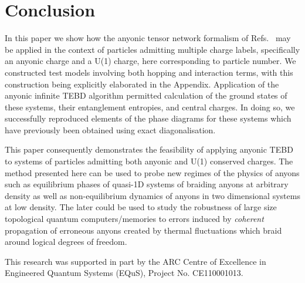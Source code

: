 \documentclass[aps,reprint,superscriptaddress,amsmath,amssymb,amsfonts,prb]{revtex4-1}
\begin{document}
\section{Conclusion}
In this paper we show how the anyonic tensor network formalism of Refs.~ may be applied in the context of particles admitting multiple charge labels, specifically an anyonic charge and a U(1) charge, here corresponding to particle number. We constructed test models involving both hopping and interaction terms, with this construction being explicitly elaborated in the Appendix. Application of the anyonic infinite TEBD algorithm\cite{Singh} permitted calculation of the ground states of these systems, their entanglement entropies, and central charges. In doing so, we successfully reproduced elements of the phase diagrams for these systems which have previously been obtained using exact diagonalisation.\cite{Feiguin2007,Trebst2008, Trebst2008a, Poilblanc2011a,Poilblanc2011}

This paper consequently demonstrates the feasibility of applying anyonic TEBD to systems of particles admitting both anyonic and U(1) conserved charges. The method presented here can be used to probe new regimes of the physics of anyons such as equilibrium phases of quasi-1D systems of braiding anyons at arbitrary density as well as non-equilibrium dynamics of anyons in two dimensional systems at low density. The later could be used to study the robustness of large size topological quantum computers/memories to errors induced by \emph{coherent} propagation of erroneous anyons created by thermal fluctuations which braid around logical degrees of freedom.


\acknowledgments
This research was supported in part by the ARC Centre of Excellence in Engineered Quantum Systems (EQuS), Project No. CE110001013. 






\appendix 
\end{document}
